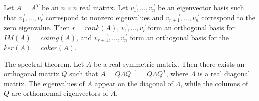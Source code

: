 \begin{theorem}
  Let $A=A^{T}$ be an $n\times n$ real matrix. Let $\vec{v_1},\ldots,\vec{v_n}$ be an eigenvector basis such that $\vec{v_1},\ldots,\vec{v_r}$ correspond to nonzero eigenvalues and $\vec{v_{r+1}},\ldots,\vec{v_n}$ correspond to the zero eigenvalue. Then $r=rank(A)$, $\vec{v_1},\ldots,\vec{v_r}$ form an orthogonal basis for $IM(A)=coimg(A)$, and $\vec{v_{r+1}},\ldots,\vec{v_n}$ form an orthogonal basis for the $ker(A)=coker(A)$.
\end{theorem}
\begin{theorem}
  The spectral theorem. Let $A$ be a real symmetric matrix. Then there exists an orthogonal matrix $Q$ such that $A=Q\Lambda Q^{-1}=Q\Lambda Q^{T}$, where $\Lambda $ is a real diagonal matrix. The eigenvalues of $A$ appear on the diagonal of $\Lambda $, while the columns of $Q$ are orthonormal eigenvectors of $A$.
\end{theorem}
